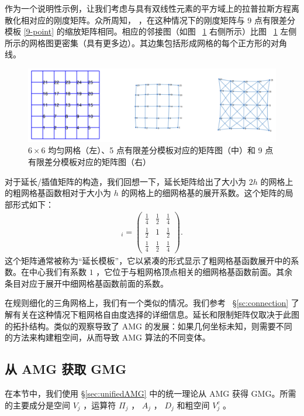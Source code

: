 \documentclass[12pt]{acta_2011xz}
\begin{document}
作为一个说明性示例，让我们考虑与具有双线性元素的平方域上的拉普拉斯方程离散化相对应的刚度矩阵。众所周知，
   \cite{2002CiarletP-aa}    ，在这种情况下的刚度矩阵与 9 点有限差分模板    \eqref{9-point}    的缩放矩阵相同。相应的邻接图（如图~    \ref{gmg}    右侧所示）比图~    \ref{gmg}    左侧所示的网格图更密集（具有更多边）。其边集包括形成网格的每个正方形的对角线。
   \begin{figure}[!htb]
\centering
    \includegraphics[width=1.0\textwidth]{graph}
\caption{   $6\times 6$    均匀网格（左）、5 点有限差分模板对应的矩阵图（中）和 9 点有限差分模板对应的矩阵图（右）  }
\label{gmg}
\end{figure}    对于延长/插值矩阵的构造，我们回想一下，延长矩阵给出了大小为    $2h$    的网格上的粗网格基函数相对于大小为    $h$    的网格上的细网格基的展开系数。这个矩阵的局部形式如下：
   \begin{eqnarray*}
  [(P_{2h}^h)^T]_i=
\begin{pmatrix}
  \frac{1}{4} &\frac{1}{2} &\frac{1}{4} \\ 
  \frac{1}{2} & 1 & \frac{1}{2} \\ 
 \frac{1}{4} & \frac{1}{2} &\frac{1}{4}
\end{pmatrix}.
\end{eqnarray*}    这个矩阵通常被称为“延长模板”，它以紧凑的形式显示了粗网格基函数展开中的系数。在中心我们有系数    $1$    ，它位于与粗网格顶点相关的细网格基函数前面。其余条目对应于展开中细网格基函数前面的系数。  

在规则细化的三角网格上，我们有一个类似的情况。我们参考~   \S       \ref{sc:connection}    了解有关在这种情况下粗网格自由度选择的详细信息。延长和限制矩阵仅取决于此图的拓扑结构。类似的观察导致了 AMG 的发展：如果几何坐标未知，则需要不同的方法来构建粗空间，从而导致 AMG 算法的不同变体。  

   \subsection{从 AMG 获取 GMG  }       \label{s:gmg-from-amg}    在本节中，我们使用    \S       \ref{sec:unifiedAMG}    中的统一理论从 AMG 获得 GMG。所需的主要成分是空间    $V_j$    ，运算符    $\Pi_j$    ，    $A_j$    ，    $D_j$    和粗空间    $V_j^c$    。  
\end{document}
